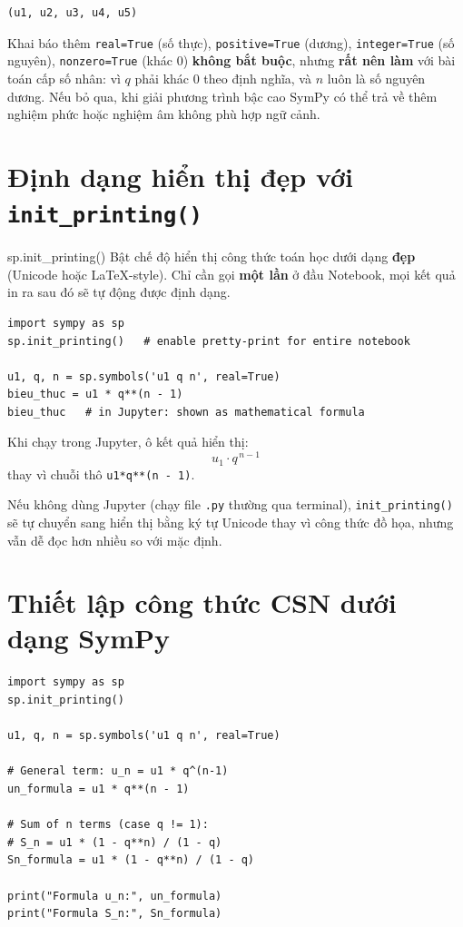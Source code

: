 \documentclass[12pt,a4paper]{report}
\begin{document}
\begin{lstlisting}[style=outstyle,numbers=none]
(u1, u2, u3, u4, u5)
\end{lstlisting}

\begin{warnbox}
Khai báo thêm \texttt{real=True} (số thực), \texttt{positive=True}
(dương), \texttt{integer=True} (số nguyên), \texttt{nonzero=True}
(khác 0) \textbf{không bắt buộc}, nhưng \textbf{rất nên làm} với bài
toán cấp số nhân: vì $q$ phải khác 0 theo định nghĩa, và $n$ luôn là
số nguyên dương. Nếu bỏ qua, khi giải phương trình bậc cao SymPy có
thể trả về thêm nghiệm phức hoặc nghiệm âm không phù hợp ngữ cảnh.
\end{warnbox}

\section{Định dạng hiển thị đẹp với \texttt{init\_printing()}}

\begin{syntaxbox}{sp.init\_printing()}
Bật chế độ hiển thị công thức toán học dưới dạng \textbf{đẹp}
(Unicode hoặc LaTeX-style). Chỉ cần gọi \textbf{một lần} ở đầu
Notebook, mọi kết quả in ra sau đó sẽ tự động được định dạng.
\end{syntaxbox}

\begin{lstlisting}[caption={Bật chế độ in đẹp}]
import sympy as sp
sp.init_printing()   # enable pretty-print for entire notebook

u1, q, n = sp.symbols('u1 q n', real=True)
bieu_thuc = u1 * q**(n - 1)
bieu_thuc   # in Jupyter: shown as mathematical formula
\end{lstlisting}

Khi chạy trong Jupyter, ô kết quả hiển thị:
\[
u_1 \cdot q^{\,n-1}
\]
thay vì chuỗi thô \texttt{u1*q**(n - 1)}.

\begin{infobox}
Nếu không dùng Jupyter (chạy file \texttt{.py} thường qua terminal),
\texttt{init\_printing()} sẽ tự chuyển sang hiển thị bằng ký tự Unicode
thay vì công thức đồ họa, nhưng vẫn dễ đọc hơn nhiều so với mặc định.
\end{infobox}

\section{Thiết lập công thức CSN dưới dạng SymPy}

\begin{lstlisting}[caption={Biểu thức số hạng tổng quát và tổng $S_n$}]
import sympy as sp
sp.init_printing()

u1, q, n = sp.symbols('u1 q n', real=True)

# General term: u_n = u1 * q^(n-1)
un_formula = u1 * q**(n - 1)

# Sum of n terms (case q != 1):
# S_n = u1 * (1 - q**n) / (1 - q)
Sn_formula = u1 * (1 - q**n) / (1 - q)

print("Formula u_n:", un_formula)
print("Formula S_n:", Sn_formula)
\end{lstlisting}
\end{document}
